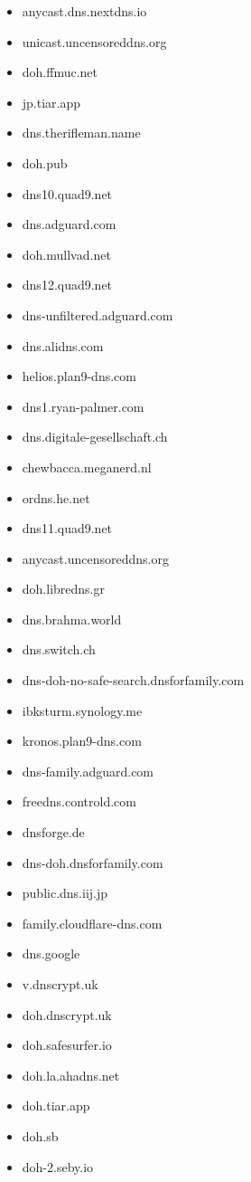 \begin{small}
\begin{itemize}
\item anycast.dns.nextdns.io
\item unicast.uncensoreddns.org
\item doh.ffmuc.net
\item jp.tiar.app
\item dns.therifleman.name
\item doh.pub
\item dns10.quad9.net
\item dns.adguard.com
\item doh.mullvad.net
\item dns12.quad9.net
\item dns-unfiltered.adguard.com
\item dns.alidns.com
\item helios.plan9-dns.com
\item dns1.ryan-palmer.com
\item dns.digitale-gesellschaft.ch
\item chewbacca.meganerd.nl
\item ordns.he.net
\item dns11.quad9.net
\item anycast.uncensoreddns.org
\item doh.libredns.gr
\item dns.brahma.world
\item dns.switch.ch
\item dns-doh-no-safe-search.dnsforfamily.com
\item ibksturm.synology.me
\item kronos.plan9-dns.com
\item dns-family.adguard.com
\item freedns.controld.com
\item dnsforge.de
\item dns-doh.dnsforfamily.com
\item public.dns.iij.jp
\item family.cloudflare-dns.com
\item dns.google
\item v.dnscrypt.uk
\item doh.dnscrypt.uk
\item doh.safesurfer.io
\item doh.la.ahadns.net
\item doh.tiar.app
\item doh.sb
\item doh-2.seby.io

\end{itemize}
\end{small}
